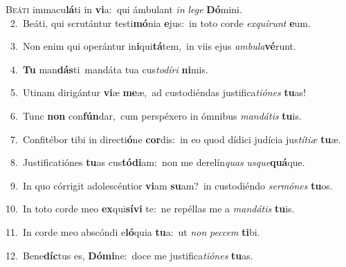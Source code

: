 \lettrine{\initial\textcolor{\initialcolor}{B}}{eáti} immacu\-\textbf{lá}\-ti in \textbf{vi}\-a:~\star qui ámbulant \textit{in} \textit{le}\-\textit{ge} \textbf{Dó}\-mini.\\
{\numbfont\textcolor{\numbcolor}{~2.}}~Beáti, qui scrutántur testi\-\textbf{mó}\-nia \textbf{e}\-jus:~\star in toto corde \textit{ex}\-\textit{quí}\textit{runt} \textbf{e}\-um.\par
{\numbfont\textcolor{\numbcolor}{~3.}}~Non enim qui operántur in\-\textbf{i}\-qui\-\textbf{tá}\-tem,~\star in viis ejus \textit{am}\-\textit{bu}\textit{la}\textbf{vé}runt.\par
{\numbfont\textcolor{\numbcolor}{~4.}}~\textbf{Tu} man\-\textbf{dás}\-ti~\star mandáta tua cus\-\textit{to}\-\textit{dí}\textit{ri} \textbf{ni}\-mis.\par
{\numbfont\textcolor{\numbcolor}{~5.}}~Utinam dirigántur \textbf{vi}\-æ \textbf{me}\-æ,~\star ad custodiéndas justifica\-\textit{ti}\-\textit{ó}\textit{nes} \textbf{tu}\-as!\par
{\numbfont\textcolor{\numbcolor}{~6.}}~Tunc \textbf{non} con\-\textbf{fún}\-dar,~\star cum perspéxero in ómnibus \textit{man}\-\textit{dá}\textit{tis} \textbf{tu}\-is.\par
{\numbfont\textcolor{\numbcolor}{~7.}}~Confitébor tibi in directi\-\textbf{ó}\-ne \textbf{cor}\-dis:~\star in eo quod dídici judícia jus\-\textit{tí}\-\textit{ti}\textit{æ} \textbf{tu}\-æ.\par
{\numbfont\textcolor{\numbcolor}{~8.}}~Justificatiónes \textbf{tu}\-as cus\-\textbf{tó}\-\textbf{di}am:~\star non me derelín\textit{quas} \textit{us}\-\textit{que}\textbf{quá}que.\par
{\numbfont\textcolor{\numbcolor}{~9.}}~In quo córrigit adolescéntior \textbf{vi}\-am \textbf{su}\-am?~\star in custodiéndo \textit{ser}\-\textit{mó}\textit{nes} \textbf{tu}\-os.\par
{\numbfont\textcolor{\numbcolor}{10.}}~In toto corde meo \textbf{ex}\-qui\-\textbf{sí}\-\textbf{vi} te:~\star ne repéllas me a \textit{man}\-\textit{dá}\textit{tis} \textbf{tu}\-is.\par
{\numbfont\textcolor{\numbcolor}{11.}}~In corde meo abscóndi e\-\textbf{ló}\-quia \textbf{tu}\-a:~\star ut \textit{non} \textit{pec}\-\textit{cem} \textbf{ti}\-bi.\par
{\numbfont\textcolor{\numbcolor}{12.}}~Bene\-\textbf{díc}\-tus es, \textbf{Dó}\-\textbf{mi}ne:~\star doce me justifica\-\textit{ti}\-\textit{ó}\textit{nes} \textbf{tu}\-as.\par
